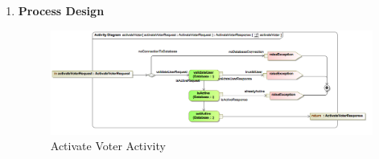 \begin{enumerate}
\begin{enumerate}
			\item \textbf{Process Design}
			\begin{figure}[H]
				\centering
				\includegraphics[width=0.75\linewidth]{../Images/Database/Activity/ActivateVoter_Activity.png}
				\caption{Activate Voter Activity}
			\end{figure}
			
		\end{enumerate}
\end{enumerate}
